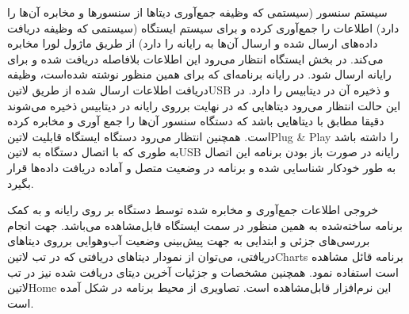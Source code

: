 سیستم سنسور (سیستمی که وظیفه جمع‌آوری دیتا‌ها از سنسور‌ها و مخابره آن‌ها را دارد) اطلاعات را جمع‌آوری کرده و برای سیستم ایستگاه (سیستمی که وظیفه دریافت داده‌های ارسال شده و ارسال آن‌ها به رایانه را دارد) از طریق ماژول لورا مخابره می‌کند. در بخش ایستگاه انتظار می‌رود این اطلاعات بلافاصله دریافت شده و برای رایانه ارسال شود. در رایانه برنامه‌ای که برای همین منظور نوشته شده‌است، وظیفه دریافت اطلاعات ارسال شده از طریق ‌لاتین{USB} و ذخیره آن در دیتابیس را دارد. در این حالت انتظار می‌رود دیتا‌هایی که در نهایت برروی رایانه در دیتابیس ذخیره می‌شوند دقیقا مطابق با دیتا‌هایی باشد که دستگاه سنسور آن‌ها را جمع آوری و مخابره کرده است. همچنین انتظار می‌رود دستگاه ایستگاه قابلیت ‌لاتین{Plug \& Play} را داشته باشد به طوری که با اتصال دستگاه به ‌لاتین{USB} رایانه در صورت باز بودن برنامه این اتصال به طور خودکار شناسایی شده و برنامه در وضعیت متصل و آماده دریافت داده‌ها قرار بگیرد. 

خروجی اطلاعات جمع‌آوری و مخابره شده توسط دستگاه بر روی رایانه و به کمک برنامه ساخته‌شده به همین منظور در سمت ایستگاه قابل‌مشاهده می‌باشد. جهت انجام بررسی‌های جزئی و ابتدایی به جهت پیش‌بینی وضعیت آب‌و‌هوایی برروی دیتاهای دریافتی، می‌توان از نمودار دیتاهای دریافتی که در تب ‌لاتین{Charts} برنامه قائل مشاهده است استفاده نمود. همچنین مشخصات و جزئیات آخرین دیتای دریافت شده نیز در تب ‌لاتین{Home} این نرم‌افزار قابل‌مشاهده است. تصاویری از محیط برنامه در  شکل  آمده است.

